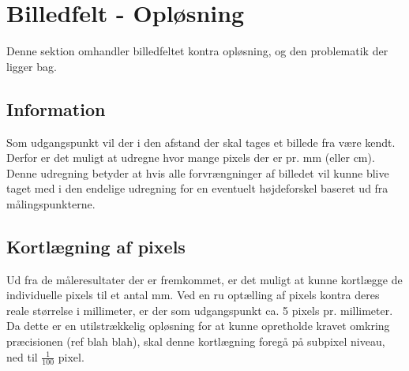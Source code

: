 \section{Billedfelt - Opløsning}

Denne sektion omhandler billedfeltet kontra opløsning, og den problematik der ligger bag.

\subsection{Information}

Som udgangspunkt vil der i den afstand der skal tages et billede fra være kendt. Derfor er det muligt at udregne hvor mange pixels der er pr. mm (eller cm). Denne udregning betyder at hvis alle forvrængninger af billedet vil kunne blive taget med i den endelige udregning for en eventuelt højdeforskel baseret ud fra målingspunkterne.

\subsection{\label{ref:kort}Kortlægning af pixels}

Ud fra de måleresultater der er fremkommet, er det muligt at kunne kortlægge de individuelle pixels til et antal mm. Ved en ru optælling af pixels kontra deres reale størrelse i millimeter, er der som udgangspunkt ca. 5 pixels pr. millimeter.
Da dette er en utilstrækkelig opløsning for at kunne opretholde kravet omkring præcisionen (ref blah blah), skal denne kortlægning foregå på subpixel niveau, ned til $\frac{1}{100}$ pixel.

